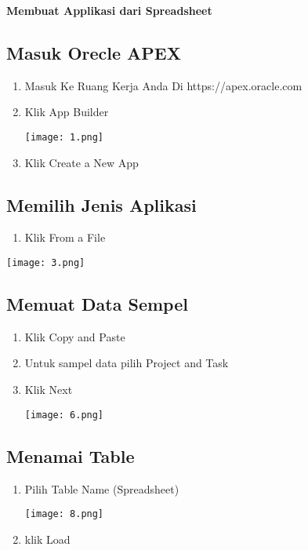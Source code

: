 \documentclass[a4paper,12pt]{report}
\begin{document}
\textbf{Membuat Applikasi dari Spreadsheet}
\subsection{Masuk Orecle APEX}
\begin{enumerate}
    \item Masuk Ke Ruang Kerja Anda Di https://apex.oracle.com
    \item Klik App Builder
    \begin{center}
    \texttt{[image: 1.png]}
    \end{center}
    \item Klik Create a New App
\end{enumerate}
\subsection{Memilih Jenis Aplikasi}
\begin{enumerate}
    \item Klik From a File
\end{enumerate}
 \begin{center}
    \texttt{[image: 3.png]}
    \end{center}
\subsection{Memuat Data Sempel}
\begin{enumerate}
    \item Klik Copy and Paste 
    \item Untuk sampel data pilih Project and Task
    \item Klik Next
    \begin{center}
    \texttt{[image: 6.png]}
    \end{center}
\end{enumerate}
\subsection{Menamai Table}
\begin{enumerate}
    \item Pilih Table Name (Spreadsheet)
    \begin{center}
    \texttt{[image: 8.png]}
    \end{center}
    \item klik Load
\end{enumerate}
\end{document}
